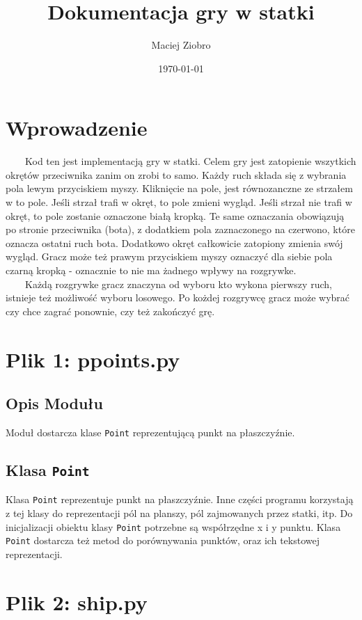 \documentclass[12pt]{article}
\title{Dokumentacja gry w statki}
\author{Maciej Ziobro}
\date{\today}
\begin{document}
\maketitle
\newpage

\section{Wprowadzenie}
$\qquad$Kod ten jest implementacją gry w statki. Celem gry jest zatopienie wszytkich okrętów przeciwnika zanim on zrobi to samo. 
Każdy ruch składa się z wybrania pola lewym przyciskiem myszy. Kliknięcie na pole, jest równozanczne ze strzałem w to pole.
Jeśli strzał trafi w okręt, to pole zmieni wygląd. Jeśli strzał nie trafi w okręt, to pole zostanie oznaczone białą kropką.
Te same oznaczania obowiązują po stronie przeciwnika (bota), z dodatkiem pola zaznaczonego na czerwono, które oznacza
ostatni ruch bota. Dodatkowo okręt całkowicie zatopiony zmienia swój wygląd. Gracz może też prawym przyciskiem myszy
oznaczyć dla siebie pola czarną kropką - oznacznie to nie ma żadnego wpływy na rozgrywke.\\
$\qquad$Każdą rozgrywke gracz znaczyna od wyboru kto wykona pierwszy ruch, istnieje też możliwość wyboru losowego. 
Po kożdej rozgrywcę gracz może wybrać czy chce zagrać ponownie, czy też zakończyć grę.\\ 

\section{Plik 1: ppoints.py}
    \subsection{Opis Modułu}
        Moduł dostarcza klase \texttt{Point} reprezentującą punkt na płaszczyźnie. 

    \subsection{Klasa \texttt{Point}}
        Klasa \texttt{Point} reprezentuje punkt na płaszczyźnie. Inne części programu korzystają z tej klasy do reprezentacji pól na planszy, pól 
        zajmowanych przez statki, itp. Do inicjalizacji obiektu klasy \texttt{Point} potrzebne są współrzędne x i y punktu. 
        Klasa \texttt{Point} dostarcza też metod do porównywania punktów, oraz ich tekstowej reprezentacji.

\section{Plik 2: ship.py}
\end{document}
